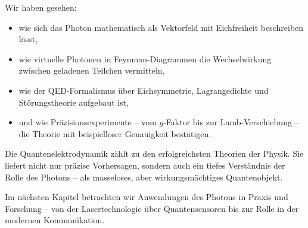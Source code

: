 Wir haben gesehen:
\begin{itemize}
	\item wie sich das Photon mathematisch als Vektorfeld mit Eichfreiheit beschreiben lässt,
	\item wie virtuelle Photonen in Feynman-Diagrammen die Wechselwirkung zwischen geladenen Teilchen vermitteln,
	\item wie der QED-Formalismus über Eichsymmetrie, Lagrangedichte und Störungstheorie aufgebaut ist,
	\item und wie Präzisionsexperimente – vom $g$-Faktor bis zur Lamb-Verschiebung – die Theorie mit beispielloser Genauigkeit bestätigen.
\end{itemize}

Die Quantenelektrodynamik zählt zu den erfolgreichsten Theorien der Physik. Sie liefert nicht nur präzise Vorhersagen, sondern auch ein tiefes Verständnis der Rolle des Photons – als masseloses, aber wirkungsmächtiges Quantenobjekt. 

\vspace{1em}
\begin{tcolorbox}[hinweisbox,title=Ausblick auf Kapitel VI]
	\label{box:Ausblick auf Kapitel 6}
	Im nächsten Kapitel betrachten wir Anwendungen des Photons in Praxis und Forschung – von der Lasertechnologie über Quantensensoren bis zur Rolle in der modernen Kommunikation.
\end{tcolorbox}
